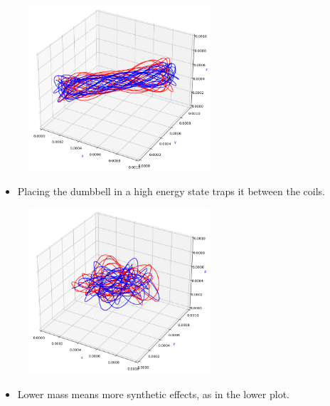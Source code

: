 \documentclass[20pt]{beamer}
\begin{document}
\begin{frame}{}
\begin{textblock}{7.25}
   \begin{figure}[h]
           \centering
           \includegraphics[width=0.6\textwidth]{(0,2)-comp1}
           \label{fig:comp2}
   \end{figure}
   \begin{itemize}[label=\textbullet, leftmargin=25mm]
           \item Placing the dumbbell in a high energy
                   state traps it between the coils.
   \end{itemize}
   \begin{figure}[h]
           \centering
           \includegraphics[width=0.6\textwidth]{(1,1)-comp1}
           \label{fig:comp1}
   \end{figure}
   \begin{itemize}[label=\textbullet, leftmargin=25mm]
           \item Lower mass means more synthetic effects, as in the lower plot.
   \end{itemize}

  \end{textblock}



 \end{frame} 
\end{document}
